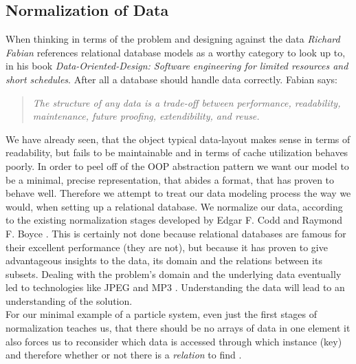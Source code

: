 \subsection{Normalization of Data}
When thinking in terms of the problem and designing against the data \textit{Richard Fabian} references relational database models as a worthy category to look up to, in his book \textit{Data-Oriented-Design: Software engineering for limited resources and short schedules}. After all a database should handle data correctly. Fabian says:
\begin{quote}
\textit{The structure of any data is a trade-off between performance, readability, maintenance, future proofing, extendibility, and reuse.} 
\end{quote}
We have already seen, that the object typical data-layout makes sense in terms of readability, but fails to be maintainable and in terms of cache utilization behaves poorly. In order to peel off of the OOP abstraction pattern we want our model to be a minimal, precise representation, that abides a format, that has proven to behave well. Therefore we attempt to treat our data modeling process the way we would, when setting up a relational database. We normalize our data, according to the existing normalization stages developed by Edgar F. Codd and Raymond F. Boyce . This is certainly not done because relational databases are famous for their excellent performance (they are not), but because it has proven to give advantageous insights to the data, its domain and the relations between its subsets. Dealing with the problem's domain and the underlying data eventually led to technologies like JPEG and MP3 . Understanding the data will lead to an understanding of the solution.\\
For our minimal example of a particle system, even just the first stages of normalization teaches us, that there should be no arrays of data in one element  it also forces us to reconsider which data is accessed through which instance (key) and therefore whether or not there is a \textit{relation} to find .\\

